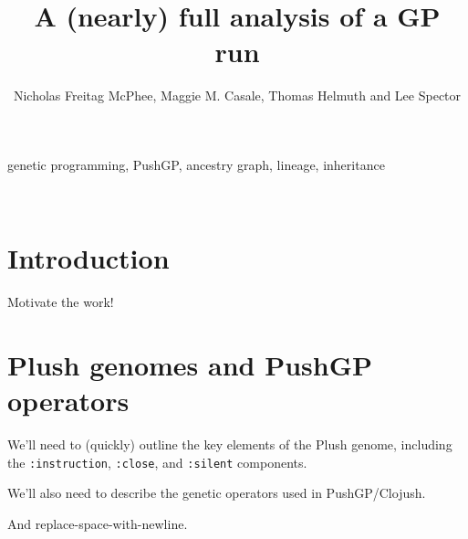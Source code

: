 %

\title*{A (nearly) full analysis of a GP run}
\author{Nicholas Freitag McPhee, Maggie M. Casale, Thomas Helmuth and Lee Spector}

\maketitle


\begin{keywords}
	genetic programming, PushGP, ancestry graph, lineage, inheritance
\end{keywords}
\\
\section{Introduction}
\label{sec:introduction}

Motivate the work!

\section{Plush genomes and PushGP operators}
\label{sec:background}


We'll need to (quickly) outline the key elements of the Plush genome, including
the \texttt{:instruction}, \texttt{:close}, and \texttt{:silent} components.

We'll also need to describe the genetic operators used in PushGP/Clojush.

And replace-space-with-newline.


